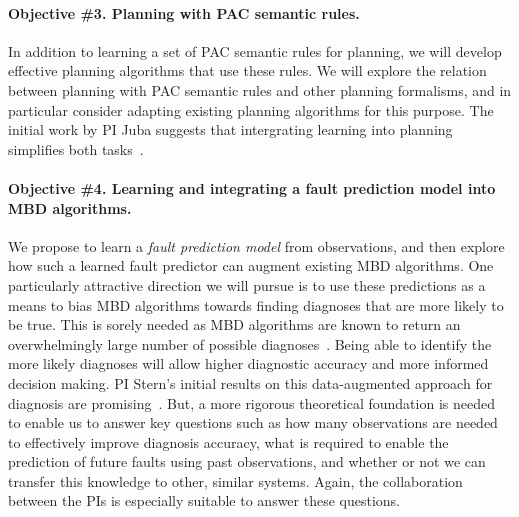 \documentclass[12pt]{article}
\begin{document}
\paragraph{Objective \#3. Planning with PAC semantic rules.}
In addition to learning a set of PAC semantic rules for planning, we will develop effective planning algorithms that use these rules. We will explore the relation between planning with PAC semantic rules and other planning formalisms, and in particular consider adapting existing planning algorithms for this purpose. The initial work by PI Juba suggests that intergrating learning into planning simplifies both tasks~\cite{juba2016jmlr}. 

\vspace{-0.35cm}
\paragraph{Objective \#4. Learning and integrating a fault prediction model into MBD algorithms.} 
We propose to learn a {\em fault prediction model} from observations, and then explore how such a learned fault predictor can augment existing MBD algorithms. 
One particularly attractive direction we will pursue is to use these predictions as a means to bias MBD algorithms towards finding diagnoses that are more likely to be true. This is sorely needed as MBD algorithms are known to return an overwhelmingly large number of possible diagnoses~\cite{stern2015many}. Being able to identify the more likely diagnoses will allow higher diagnostic accuracy and more informed decision making. PI Stern's initial results on this data-augmented approach for diagnosis are promising~\cite{elmishali2016dataAugmented}. But, a more rigorous theoretical foundation is needed to enable us to answer key questions such as how many observations are needed to effectively improve diagnosis accuracy, what is required to enable the prediction of future faults using past observations, and whether or not we can transfer this knowledge to other, similar systems. Again, the collaboration between the PIs is especially suitable to answer these questions. 

\end{document}
